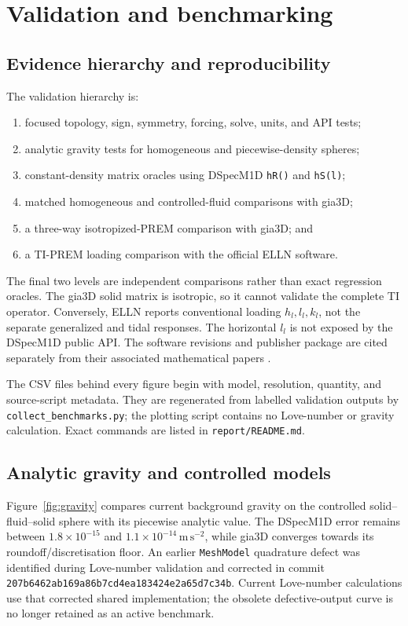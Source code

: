 \documentclass[11pt,a4paper]{article}
\newcommand{\code}[1]{\texttt{#1}}
\begin{document}
\section{Validation and benchmarking}

\subsection{Evidence hierarchy and reproducibility}

The validation hierarchy is:
\begin{enumerate}
\item focused topology, sign, symmetry, forcing, solve, units, and API tests;
\item analytic gravity tests for homogeneous and piecewise-density spheres;
\item constant-density matrix oracles using DSpecM1D
      \code{hR()} and \code{hS(l)};
\item matched homogeneous and controlled-fluid comparisons with gia3D;
\item a three-way isotropized-PREM comparison with gia3D; and
\item a TI-PREM loading comparison with the official ELLN software.
\end{enumerate}
The final two levels are independent comparisons rather than exact
regression oracles.  The gia3D solid matrix is isotropic, so it cannot
validate the complete TI operator.  Conversely, ELLN reports conventional
loading \(h_l,l_l,k_l\), not the separate generalized and tidal responses.
The horizontal \(l_l\) is not exposed by the DSpecM1D public API.
The software revisions and publisher package are cited separately from their
associated mathematical papers
\citep{gia3d_software,gia3d_core_software,elln_supporting_information}.

The CSV files behind every figure begin with model, resolution, quantity, and
source-script metadata.  They are regenerated from labelled validation
outputs by \code{collect\_benchmarks.py}; the plotting script contains no
Love-number or gravity calculation.  Exact commands are listed in
\code{report/README.md}.

\subsection{Analytic gravity and controlled models}

Figure~\ref{fig:gravity} compares current background gravity on the
controlled solid--fluid--solid sphere with its piecewise analytic value.
The DSpecM1D error remains between \(1.8\times10^{-15}\) and
\(1.1\times10^{-14}\,\mathrm{m\,s^{-2}}\), while gia3D converges towards its
roundoff/discretisation floor.  An earlier \code{MeshModel} quadrature defect
was identified during Love-number validation and corrected in commit
\code{207b6462ab169a86b7cd4ea183424e2a65d7c34b}.  Current Love-number
calculations use that corrected shared implementation; the obsolete
defective-output curve is no longer retained as an active benchmark.
\end{document}
